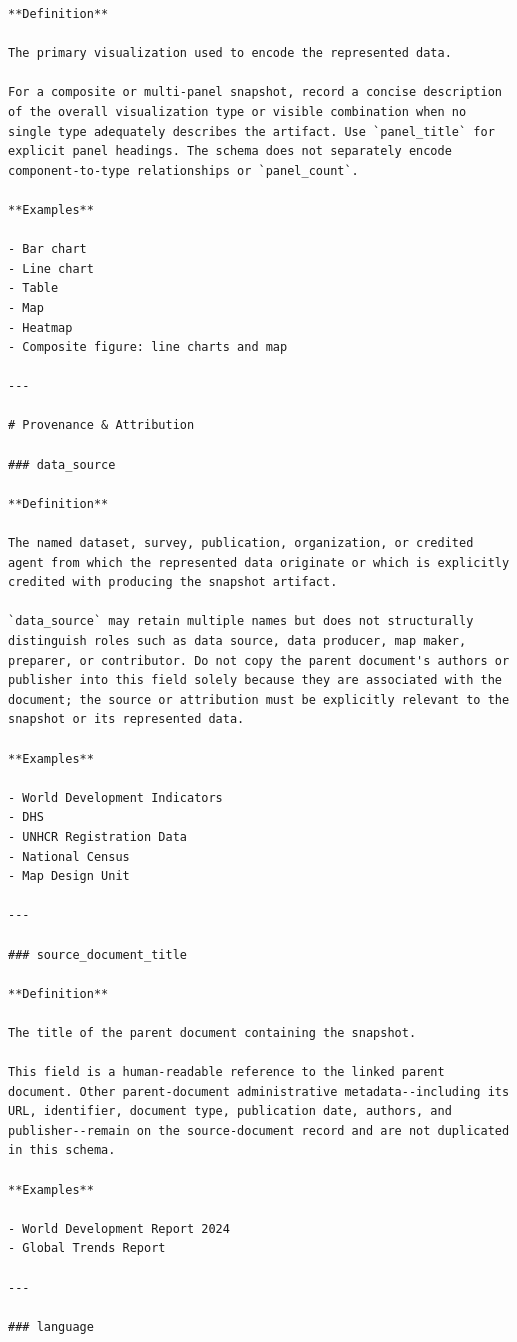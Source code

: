 \documentclass{article}
\begin{document}
\begin{lstlisting}
**Definition**

The primary visualization used to encode the represented data.

For a composite or multi-panel snapshot, record a concise description of the overall visualization type or visible combination when no single type adequately describes the artifact. Use `panel_title` for explicit panel headings. The schema does not separately encode component-to-type relationships or `panel_count`.

**Examples**

- Bar chart
- Line chart
- Table
- Map
- Heatmap
- Composite figure: line charts and map

---

# Provenance & Attribution

### data_source

**Definition**

The named dataset, survey, publication, organization, or credited agent from which the represented data originate or which is explicitly credited with producing the snapshot artifact.

`data_source` may retain multiple names but does not structurally distinguish roles such as data source, data producer, map maker, preparer, or contributor. Do not copy the parent document's authors or publisher into this field solely because they are associated with the document; the source or attribution must be explicitly relevant to the snapshot or its represented data.

**Examples**

- World Development Indicators
- DHS
- UNHCR Registration Data
- National Census
- Map Design Unit

---

### source_document_title

**Definition**

The title of the parent document containing the snapshot.

This field is a human-readable reference to the linked parent document. Other parent-document administrative metadata--including its URL, identifier, document type, publication date, authors, and publisher--remain on the source-document record and are not duplicated in this schema.

**Examples**

- World Development Report 2024
- Global Trends Report

---

### language


\end{lstlisting}
\end{document}
